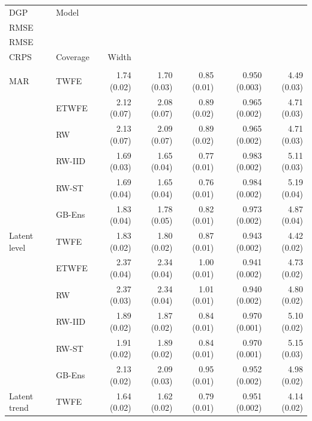 \begin{table}
\fontsize{9.0pt}{11.0pt}\selectfont\setlength\tabcolsep{3.5pt}
\begin{tabular*}{1\linewidth}{@{\extracolsep{\fill}}llrrrrr}
\toprule
DGP & Model & \begin{tabular}[b]{@{}r@{}}County-effect\\RMSE\end{tabular} & \begin{tabular}[b]{@{}r@{}}Centered\\RMSE\end{tabular} & \begin{tabular}[b]{@{}r@{}}County\\CRPS\end{tabular} & Coverage & Width \\ 
\midrule\addlinespace[2.5pt]
\multicolumn{7}{l}{Without covariates} \\[2.5pt] 
\midrule\addlinespace[2.5pt]
MAR & TWFE & 1.74 (0.02) & 1.70 (0.03) & 0.85 (0.01) & 0.950 (0.003) & 4.49 (0.03) \\ 
 & ETWFE & 2.12 (0.07) & 2.08 (0.07) & 0.89 (0.02) & 0.965 (0.002) & 4.71 (0.03) \\ 
 & RW & 2.13 (0.07) & 2.09 (0.07) & 0.89 (0.02) & 0.965 (0.002) & 4.71 (0.03) \\ 
 & RW-IID & 1.69 (0.03) & 1.65 (0.04) & 0.77 (0.01) & 0.983 (0.002) & 5.11 (0.03) \\ 
 & RW-ST & 1.69 (0.04) & 1.65 (0.04) & 0.76 (0.01) & 0.984 (0.002) & 5.19 (0.04) \\ 
 & GB-Ens & 1.83 (0.04) & 1.78 (0.05) & 0.82 (0.01) & 0.973 (0.002) & 4.87 (0.04) \\ 
Latent level & TWFE & 1.83 (0.02) & 1.80 (0.02) & 0.87 (0.01) & 0.943 (0.002) & 4.42 (0.02) \\ 
 & ETWFE & 2.37 (0.04) & 2.34 (0.04) & 1.00 (0.01) & 0.941 (0.002) & 4.73 (0.02) \\ 
 & RW & 2.37 (0.03) & 2.34 (0.04) & 1.01 (0.01) & 0.940 (0.002) & 4.80 (0.02) \\ 
 & RW-IID & 1.89 (0.02) & 1.87 (0.02) & 0.84 (0.01) & 0.970 (0.001) & 5.10 (0.02) \\ 
 & RW-ST & 1.91 (0.02) & 1.89 (0.02) & 0.84 (0.01) & 0.970 (0.001) & 5.15 (0.03) \\ 
 & GB-Ens & 2.13 (0.02) & 2.09 (0.03) & 0.95 (0.01) & 0.952 (0.002) & 4.98 (0.02) \\ 
Latent trend & TWFE & 1.64 (0.02) & 1.62 (0.02) & 0.79 (0.01) & 0.951 (0.002) & 4.14 (0.02) \\ 

\end{tabular*}
\end{table}
